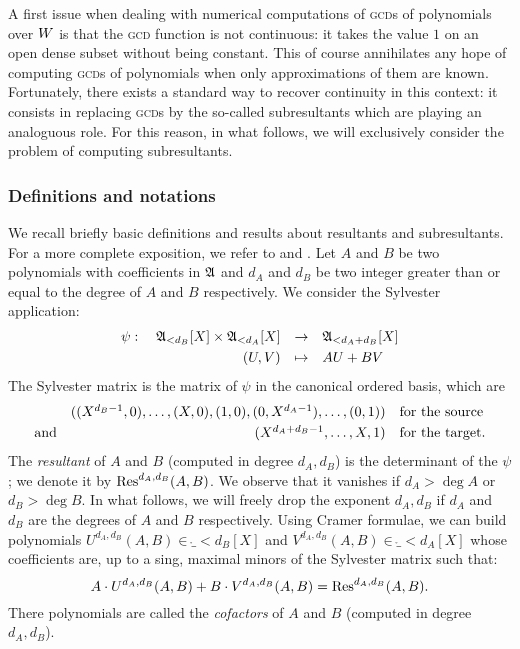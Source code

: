 \documentclass{article}
\begin{document}
A first issue when dealing with numerical computations of \textsc{gcd}s 
of polynomials over $W$ is that the \textsc{gcd} function is not 
continuous: it takes the value $1$ on an open dense subset without being 
constant. This of course annihilates any hope of computing \textsc{gcd}s 
of polynomials when only approximations of them are known. Fortunately, 
there exists a standard way to recover continuity in this context: it 
consists in replacing \textsc{gcd}s by the so-called subresultants which 
are playing an analoguous role. For this reason, in what follows, we will 
exclusively consider the problem of computing subresultants.

\subsubsection*{Definitions and notations}

We recall briefly basic definitions and results about resultants and 
subresultants. For a more complete exposition, we refer to \cite[\S 
3.3]{cohen} and \cite[\S 4.1]{winkler}.
Let $A$ and $B$ be two polynomials with coefficients in $\mathfrak A$ and 
$d_A$ and $d_B$ be two integer greater than or equal to the degree of 
$A$ and $B$ respectively. We consider the Sylvester application:
$$\begin{array}{rcl}
\psi : \quad
\ring_{< d_B}[X] \times \ring_{< d_A}[X] & \to &
\ring_{< d_A+d_B}[X] \smallskip \\
(U,V) & \mapsto & AU + BV
\end{array}$$
The Sylvester matrix is the matrix of $\psi$ in the canonical ordered
basis, which are
$$\begin{array}{rrl}
& ((X^{d_B-1},0), \ldots, (X,0), (1,0), (0,X^{d_A-1}), \ldots, (0,1))
& \text{for the source} \smallskip \\
\text{and} & (X^{d_A+d_B-1}, \ldots, X, 1) &
\text{for the target.}
\end{array}$$
The \emph{resultant} of $A$ and $B$ (computed in degree $d_A, d_B$) is the 
determinant of the $\psi$; we denote it by $\text{\rm Res}^{d_A,d_B}(A,B)$. We 
observe that it vanishes if $d_A > \deg A$ or $d_B > \deg B$. In what 
follows, we will freely drop the exponent $d_A, d_B$ if $d_A$ and $d_B$ 
are the degrees of $A$ and $B$ respectively.
Using Cramer formulae, we can build polynomials $U^{d_A, d_B}(A,B) \in
\ring_{< d_B}[X]$ and $V^{d_A, d_B}(A,B) \in \ring_{< d_A}[X]$ whose 
coefficients are, up to a sing, maximal minors of the Sylvester matrix 
such that:
$$A \cdot U^{d_A, d_B}(A,B) + B \cdot V^{d_A, d_B}(A,B) = 
\text{\rm Res}^{d_A, d_B}(A,B).$$
There polynomials are called the \emph{cofactors} of $A$ and $B$
(computed in degree $d_A, d_B$).
\end{document}
